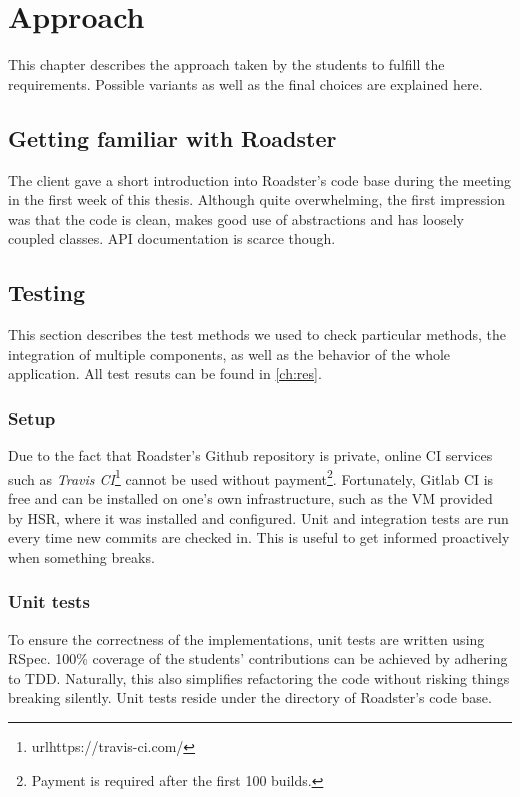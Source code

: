 \chapter{Approach}
This chapter describes the approach taken by the students to fulfill the
requirements. Possible variants as well as the final choices are explained here.

\section{Getting familiar with Roadster}
The client gave a short introduction into Roadster's code base during the meeting in the first
week of this thesis. Although quite overwhelming, the first impression was that
the code is clean, makes good use of abstractions and has loosely coupled
classes. API documentation is scarce though.


\section{Testing}
This section describes the test methods we used to check particular methods,
the integration of multiple components, as well as the behavior of the whole application.
All test resuts can be found in \autoref{ch:res}.

\subsection{Setup}
Due to the fact that Roadster's Github repository is private, online \gls{CI}
services such as \emph{Travis
CI}\footnote{url{https://travis-ci.com/}} cannot be used without
payment\footnote{Payment is required after the first 100 builds.}. Fortunately,
Gitlab CI is free and can be installed on one's own infrastructure, such as the
\gls{VM} provided by HSR, where it was installed and configured. Unit and
integration tests are run every time new commits are checked in. This is useful
to get informed proactively when something breaks.

\subsection{Unit tests}
To ensure the correctness of the implementations, unit tests are written using
RSpec. 100\% coverage of the students' contributions can be achieved by
adhering to \gls{TDD}. Naturally, this also simplifies refactoring the code
without risking things breaking silently. Unit tests reside under the 
directory of Roadster's code base.

